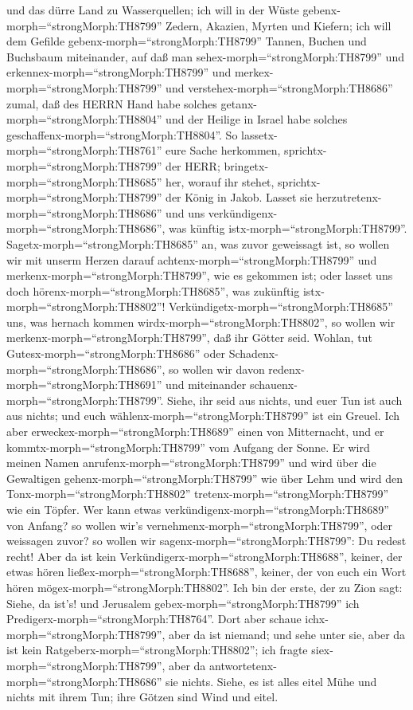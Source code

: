 und das dürre Land zu Wasserquellen;  ich will in der Wüste
gebenx-morph=``strongMorph:TH8799'' Zedern, Akazien, Myrten und Kiefern;
ich will dem Gefilde gebenx-morph=``strongMorph:TH8799'' Tannen, Buchen
und Buchsbaum miteinander,  auf daß man
sehex-morph=``strongMorph:TH8799'' und
erkennex-morph=``strongMorph:TH8799'' und
merkex-morph=``strongMorph:TH8799'' und
verstehex-morph=``strongMorph:TH8686'' zumal, daß des HERRN Hand habe
solches getanx-morph=``strongMorph:TH8804'' und der Heilige in Israel
habe solches geschaffenx-morph=``strongMorph:TH8804''.  So
lassetx-morph=``strongMorph:TH8761'' eure Sache herkommen,
sprichtx-morph=``strongMorph:TH8799'' der HERR;
bringetx-morph=``strongMorph:TH8685'' her, worauf ihr stehet,
sprichtx-morph=``strongMorph:TH8799'' der König in Jakob. 
Lasset sie herzutretenx-morph=``strongMorph:TH8686'' und uns
verkündigenx-morph=``strongMorph:TH8686'', was künftig
istx-morph=``strongMorph:TH8799''. Sagetx-morph=``strongMorph:TH8685''
an, was zuvor geweissagt ist, so wollen wir mit unserm Herzen darauf
achtenx-morph=``strongMorph:TH8799'' und
merkenx-morph=``strongMorph:TH8799'', wie es gekommen ist; oder lasset
uns doch hörenx-morph=``strongMorph:TH8685'', was zukünftig
istx-morph=``strongMorph:TH8802''! 
Verkündigetx-morph=``strongMorph:TH8685'' uns, was hernach kommen
wirdx-morph=``strongMorph:TH8802'', so wollen wir
merkenx-morph=``strongMorph:TH8799'', daß ihr Götter seid. Wohlan, tut
Gutesx-morph=``strongMorph:TH8686'' oder
Schadenx-morph=``strongMorph:TH8686'', so wollen wir davon
redenx-morph=``strongMorph:TH8691'' und miteinander
schauenx-morph=``strongMorph:TH8799''.  Siehe, ihr seid aus
nichts, und euer Tun ist auch aus nichts; und euch
wählenx-morph=``strongMorph:TH8799'' ist ein Greuel.  Ich
aber erweckex-morph=``strongMorph:TH8689'' einen von Mitternacht, und er
kommtx-morph=``strongMorph:TH8799'' vom Aufgang der Sonne. Er wird
meinen Namen anrufenx-morph=``strongMorph:TH8799'' und wird über die
Gewaltigen gehenx-morph=``strongMorph:TH8799'' wie über Lehm und wird
den Tonx-morph=``strongMorph:TH8802''
tretenx-morph=``strongMorph:TH8799'' wie ein Töpfer.  Wer
kann etwas verkündigenx-morph=``strongMorph:TH8689'' von Anfang? so
wollen wir's vernehmenx-morph=``strongMorph:TH8799'', oder weissagen
zuvor? so wollen wir sagenx-morph=``strongMorph:TH8799'': Du redest
recht! Aber da ist kein Verkündigerx-morph=``strongMorph:TH8688'',
keiner, der etwas hören ließex-morph=``strongMorph:TH8688'', keiner, der
von euch ein Wort hören mögex-morph=``strongMorph:TH8802''.
 Ich bin der erste, der zu Zion sagt: Siehe, da ist's! und
Jerusalem gebex-morph=``strongMorph:TH8799'' ich
Predigerx-morph=``strongMorph:TH8764''.  Dort aber schaue
ichx-morph=``strongMorph:TH8799'', aber da ist niemand; und sehe unter
sie, aber da ist kein Ratgeberx-morph=``strongMorph:TH8802''; ich fragte
siex-morph=``strongMorph:TH8799'', aber da
antwortetenx-morph=``strongMorph:TH8686'' sie nichts. 
Siehe, es ist alles eitel Mühe und nichts mit ihrem Tun; ihre Götzen
sind Wind und eitel.

